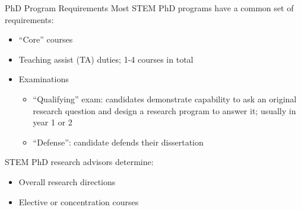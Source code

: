 \begin{frame}[fragile]{PhD Program Requirements}
    Most STEM PhD programs have a common set of requirements:
    \begin{itemize}
        \item ``Core'' courses
        \item Teaching assist (TA) duties; 1-4 courses in total
        \item Examinations
            \begin{itemize}
                \item ``Qualifying'' exam: candidates demonstrate capability to ask an original research question and design a research program to answer it; usually in year 1 or 2
                \item ``Defense'': candidate defends their dissertation
            \end{itemize}
    \end{itemize}
    STEM PhD research advisors determine:
    \begin{itemize}
        \item Overall research directions
        \item Elective or concentration courses
    \end{itemize}
\end{frame}

